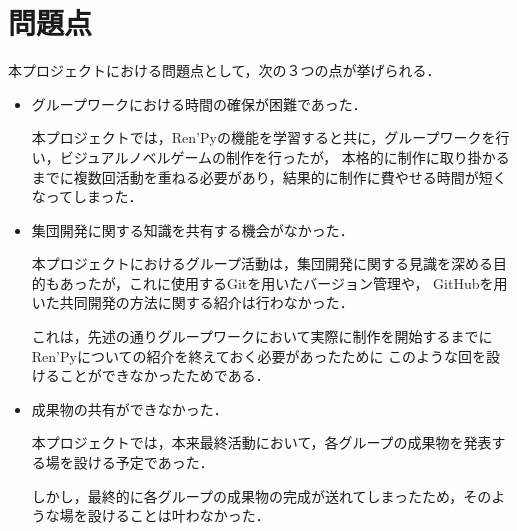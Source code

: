 \section{問題点}

  本プロジェクトにおける問題点として，次の３つの点が挙げられる．

  \begin{itemize}
    \item グループワークにおける時間の確保が困難であった．
    
      本プロジェクトでは，Ren'Pyの機能を学習すると共に，グループワークを行い，ビジュアルノベルゲームの制作を行ったが，
      本格的に制作に取り掛かるまでに複数回活動を重ねる必要があり，結果的に制作に費やせる時間が短くなってしまった．
    
    \item 集団開発に関する知識を共有する機会がなかった．
    
      本プロジェクトにおけるグループ活動は，集団開発に関する見識を深める目的もあったが，これに使用するGitを用いたバージョン管理や，
      GitHubを用いた共同開発の方法に関する紹介は行わなかった．

      これは，先述の通りグループワークにおいて実際に制作を開始するまでにRen'Pyについての紹介を終えておく必要があったために
      このような回を設けることができなかったためである．
    
    \item 成果物の共有ができなかった．
    
      本プロジェクトでは，本来最終活動において，各グループの成果物を発表する場を設ける予定であった．

      しかし，最終的に各グループの成果物の完成が送れてしまったため，そのような場を設けることは叶わなかった．
  \end{itemize}
